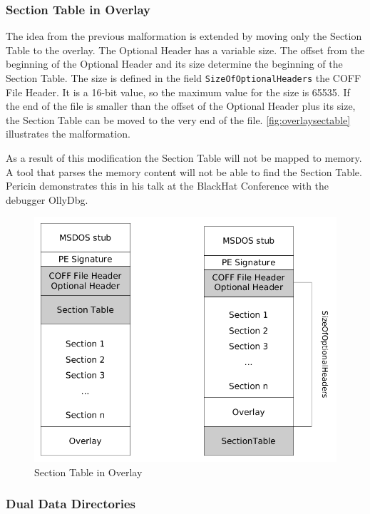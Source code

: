 \subsubsection*{Section Table in Overlay}

The idea from the previous malformation is extended by moving only the Section Table to the overlay. The Optional Header has a variable size. The offset from the beginning of the Optional Header and its size determine the beginning of the Section Table. The size is defined in the field \texttt{SizeOfOptionalHeaders} the COFF File Header. It is a 16-bit value, so the maximum value for the size is 65535. If the end of the file is smaller than the offset of the Optional Header plus its size, the Section Table can be moved to the very end of the file. \autoref{fig:overlaysectable} illustrates the malformation.

As a result of this modification the Section Table will not be mapped to memory. A tool that parses the memory content will not be able to find the Section Table. Pericin demonstrates this in his talk at the BlackHat Conference with the debugger OllyDbg. \cite[min.\thinspace{}14:45]{vuksan11} 

\begin{figure}
\includegraphics[width=.98\textwidth, height=.60\textheight,keepaspectratio]{graphics/overlaysectable}
\caption{Section Table in Overlay }
\label{fig:overlaysectable} 
\end{figure}

\subsubsection*{Dual Data Directories}

